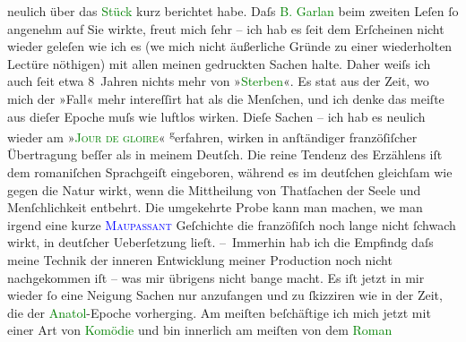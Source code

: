                neulich  über das \textcolor{green}{Stück}{} kurz berichtet habe.\pend
           \pstart
           {\pb}Daſs \textcolor{green}{\introOben{}B.\introOben{} Garlan}{}\ledrightnote{\textcolor{green}{Frau Bertha Garlan. Roman}} beim zweiten Leſen ſo angenehm auf Sie
               wirkte, freut mich ſehr – ich hab es ſeit dem Erſcheinen nicht wieder geleſen wie ich
               es (we{\geminationn} mich nicht äußerliche Gründe zu einer
               wiederholten Lectüre nöthigen) mit allen meinen gedruckten Sachen halte. Daher weiſs
               ich auch ſeit etwa 8 Jahren nichts mehr von »\textcolor{green}{Sterben}{}\ledrightnote{\textcolor{green}{Sterben. Novelle}}«. Es sta{\geminationm}t aus der Zeit, wo mich der
               »Fall« mehr intereſſirt hat als die Menſchen, und ich denke das meiſte aus dieſer
               Epoche muſs wie luftlos wirken. Dieſe Sachen – ich hab es neulich wieder am »\textcolor{green}{\textsc{Jour de {\pb}gloire}}{}\ledrightnote{\textcolor{green}{Der Ehrentag}}« \substVorne{}\textsuperscript{g}\substDazwischen{}e\substHinten{}rfahren, wirken in anſtändiger franzöſiſcher Übertragung beſſer als in meinem
               Deutſch. Die reine Tendenz des Erzählens iſt dem romaniſchen Sprachgeiſt eingeboren,
               während es im deutſchen gleichſam wie gegen die Natur wirkt, wenn die Mittheilung von
               Thatſachen der Seele und Menſchlichkeit entbehrt. Die umgekehrte Probe kann man
               machen, we{\geminationn} man irgend eine kurze \textcolor{blue}{\textsc{Maupassant}}{}\ledrightnote{\textcolor{blue}{Guy de Maupassant}} Geſchichte die franzöſiſch noch lange nicht ſchwach wirkt, in deutſcher
               Ueberſetzung lieſt.\pend
           \pstart
           – Immerhin hab ich die Empfindg daſs {\pb}meine Technik der
               inneren Entwicklung meiner Production noch nicht nachgekommen iſt – was mir übrigens
               nicht bange macht. Es iſt jetzt in mir wieder ſo eine Neigung Sachen nur anzufangen
               und zu ſkizziren wie in der Zeit, die der \textcolor{green}{Anatol}{}\ledrightnote{\textcolor{green}{Anatol}}-Epoche vorherging. Am meiſten beſchäftige ich mich jetzt mit einer Art
               von \textcolor{green}{Komödie}{} und bin innerlich
                   am meiſten von dem \textcolor{green}{Roman}{}
